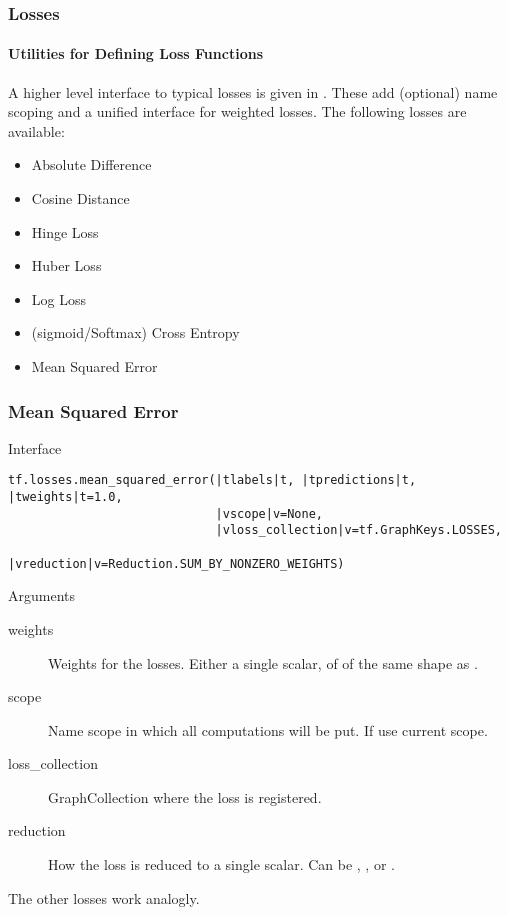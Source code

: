 
\begin{frame}
    \frametitle{Losses}
    \framesubtitle{Utilities for Defining Loss Functions}
    A higher level interface to typical losses is given in . 
    These add (optional) name scoping and a unified interface for weighted losses.
    The following losses are available:
    \begin{itemize}
        \item Absolute Difference
        \item Cosine Distance
        \item Hinge Loss
        \item Huber Loss
        \item Log Loss
        \item (sigmoid/Softmax) Cross Entropy
        \item Mean Squared Error
    \end{itemize}
\end{frame}

\begin{frame}[fragile]
    \frametitle{Mean Squared Error}
    \begin{block}{Interface}
        \begin{lstlisting}
tf.losses.mean_squared_error(|tlabels|t, |tpredictions|t, |tweights|t=1.0,
                             |vscope|v=None, 
                             |vloss_collection|v=tf.GraphKeys.LOSSES,
                             |vreduction|v=Reduction.SUM_BY_NONZERO_WEIGHTS)
        \end{lstlisting}
    \end{block}
    \begin{block}{Arguments}
        \begin{description}
            \item[weights] Weights for the losses. Either a single scalar, of of the same shape as .
            \item[scope] Name scope in which all computations will be put. If  use current scope.
            \item[loss\_collection] GraphCollection where the loss is registered.
            \item[reduction] How the loss is reduced to a single scalar. Can be , ,  
            or .
        \end{description}
    \end{block}

    The other losses work analogly.
\end{frame}

